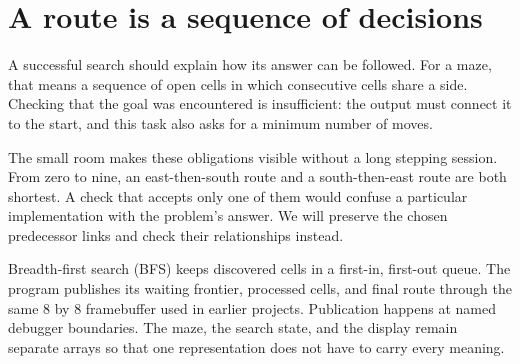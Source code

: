 \section{A route is a sequence of decisions}\label{maze-p00}

A successful search should explain how its answer can be followed. For a maze, that means a sequence of open cells in which consecutive cells share a side. Checking that the goal was encountered is insufficient: the output must connect it to the start, and this task also asks for a minimum number of moves.

The small room makes these obligations visible without a long stepping session. From zero to nine, an east-then-south route and a south-then-east route are both shortest. A check that accepts only one of them would confuse a particular implementation with the problem's answer. We will preserve the chosen predecessor links and check their relationships instead.

Breadth-first search (BFS) keeps discovered cells in a first-in, first-out queue.
The program publishes its waiting frontier, processed cells, and final route through the same 8 by 8 framebuffer used in earlier projects. Publication happens at named debugger boundaries. The maze, the search state, and the display remain separate arrays so that one representation does not have to carry every meaning.

